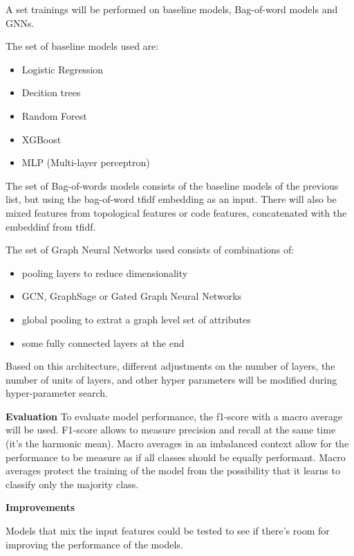 
A set trainings will be performed on baseline models, Bag-of-word models and GNNs.

The set of baseline models used are:
\begin{itemize}
	\item Logistic Regression
	\item Decition trees
	\item Random Forest
	\item XGBoost
	\item MLP (Multi-layer perceptron)
\end{itemize}

The set of Bag-of-words models consists of the baseline models of the previous list, but using the bag-of-word tfidf embedding as an input. There will also be mixed features from topological features or code features, concatenated with the embeddinf from tfidf.

The set of Graph Neural Networks used consists of combinations of:
\begin{itemize}
	\item pooling layers to reduce dimensionality
	\item GCN, GraphSage or Gated Graph Neural Networks
	\item global pooling to extrat a graph level set of attributes
	\item some fully connected layers at the end
\end{itemize}

Based on this architecture, different adjustments on the number of layers, the number of units of layers, and other hyper parameters will be modified during hyper-parameter search.



\textbf{Evaluation}
To evaluate model performance, the f1-score with a macro average will be used. F1-score allows to measure precision and recall at the same time (it's the harmonic mean). Macro averages in an imbalanced context allow for the performance to be measure as if all classes should be equally performant. Macro averages protect the training of the model from the possibility that it learns to classify only the majority class.

\textbf{Improvements}

Models that mix the input features could be tested to see if there's room for improving the performance of the models.